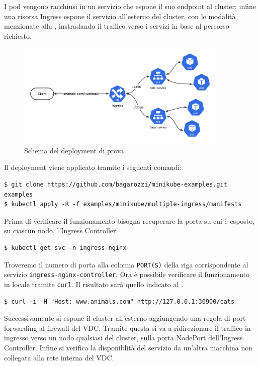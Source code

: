 \documentclass[12pt,a4paper,openright,twoside]{book}
\begin{document}
I pod vengono racchiusi in un servizio che espone il suo endpoint al cluster; infine una risorsa Ingress espone il servizio all'esterno del cluster,
con le modalità menzionate alla , instradando il traffico verso i servizi in base al percorso richiesto.
\begin{figure}[!hbt]
    \centering
    \includegraphics[width=0.9\textwidth]{figures/test-deployment.png}
    \caption{Schema del deployment di prova}
    \label{fig:test-deployment}
\end{figure}
\FloatBarrier
Il deployment viene applicato tramite i seguenti comandi:
\begin{lstlisting}
$ git clone https://github.com/bagarozzi/minikube-examples.git examples
$ kubectl apply -R -f examples/minikube/multiple-ingress/manifests
\end{lstlisting}
Prima di verificare il funzionamento bisogna recuperare la porta su cui è esposto, su ciascun nodo, l'Ingress Controller:
\begin{lstlisting}
$ kubectl get svc -n ingress-nginx                
\end{lstlisting}
Troveremo il numero di porta alla colonna \texttt{PORT(S)} della riga corrispondente al servizio \texttt{ingress-nginx-controller}.
Ora è possibile verificare il funzionamento in locale tramite \texttt{curl}. Il risultato sarà quello indicato al .
\begin{lstlisting}
$ curl -i -H "Host: www.animals.com" http://127.0.0.1:30900/cats
\end{lstlisting}
Successivamente si espone il cluster all'esterno aggiungendo una regola di port forwarding al firewall del VDC. Tramite questa si va a ridirezionare il traffico in ingresso verso
un nodo qualsiasi del cluster, sulla porta NodePort dell'Ingress Controller.
Infine si verifica la disponiblità del servizio da un'altra macchina non collegata alla rete interna del VDC. 
\end{document}
